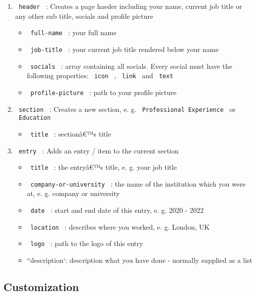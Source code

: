 \begin{enumerate}
\item
  \texttt{\ header\ } : Creates a page haeder including your name,
  current job title or any other sub title, socials and profile picture

  \begin{itemize}
  \tightlist
  \item
    \texttt{\ full-name\ } : your full name
  \item
    \texttt{\ job-title\ } : your current job title rendered below your
    name
  \item
    \texttt{\ socials\ } : array containing all socials. Every social
    must have the following properties: \texttt{\ icon\ } ,
    \texttt{\ link\ } and \texttt{\ text\ }
  \item
    \texttt{\ profile-picture\ } : path to your profile picture
  \end{itemize}
\item
  \texttt{\ section\ } : Creates a new section, e. g.
  \texttt{\ Professional\ Experience\ } or \texttt{\ Education\ }

  \begin{itemize}
  \tightlist
  \item
    \texttt{\ title\ } : sectionâ€™s title
  \end{itemize}
\item
  \texttt{\ entry\ } : Adds an entry / item to the current section

  \begin{itemize}
  \tightlist
  \item
    \texttt{\ title\ } : the entryâ€™s title, e. g. your job title
  \item
    \texttt{\ company-or-university\ } : the name of the institution
    which you were at, e. g. company or university
  \item
    \texttt{\ date\ } : start and end date of this entry, e. g. 2020 -
    2022
  \item
    \texttt{\ location\ } : describes where you worked, e. g. London, UK
  \item
    \texttt{\ logo\ } : path to the logo of this entry
  \item
    ``description`: description what you have done - normally supplied
    as a list
  \end{itemize}
\end{enumerate}

\subsection{Customization}\label{customization}

